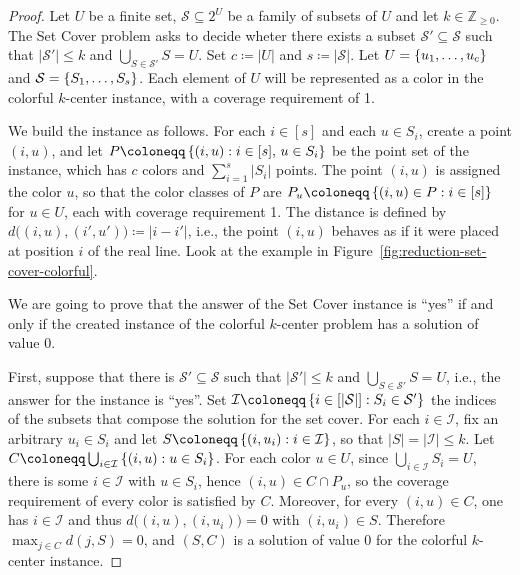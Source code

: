 \begin{proof}
    Let $U$ be a finite set, $\mathcal{S} \subseteq 2^U$ be a family of subsets of $U$ and let $k \in \mathbb{Z}_{\ge 0}$. The Set Cover problem asks to decide wheter there exists a subset $\mathcal{S}' \subseteq \mathcal{S}$ such that $|\mathcal{S}'| \le k$ and $\bigcup_{S \in \mathcal{S}'} S = U$.  Set $c \coloneqq |U|$ and $s \coloneqq |\mathcal{S}|$. Let $U = \left\{u_1,\ldots, u_c\right\}$ and $\mathcal{S} = \left\{S_1,\ldots,S_s\right\}$. Each element of $U$ will be represented as a color in the colorful $k$-center instance, with a coverage requirement of 1.

    We build the instance as follows. For each $i \in [s]$ and each $u \in S_i$, create a point $(i,u)$, and let $P \coloneqq \set{(i,u) : i \in [s],\, u \in S_i}$ be the point set of the instance, which has $c$ colors and $\sum_{i=1}^s |S_i|$ points. The point $(i,u)$ is assigned the color $u$, so that the color classes of $P$ are $P_u \coloneqq \set{(i,u) \in P : i \in [s]}$ for $u \in U$, each with coverage requirement 1. The distance is defined by $d\big((i,u),(i',u')\big) \coloneqq |i - i'|$, i.e., the point $(i,u)$ behaves as if it were placed at position $i$ of the real line. Look at the example in Figure~\ref{fig:reduction-set-cover-colorful}.
    
    We are going to prove that the answer of the Set Cover instance is ``yes'' if and only if the created instance of the colorful $k$-center problem has a solution of value 0.

    First, suppose that there is $ \mathcal{S}' \subseteq \mathcal{S}$ such that $|\mathcal{S}'| \leq k$ and $\bigcup_{S \in \mathcal{S}'} S = U$, i.e., the answer for the instance is ``yes''. Set $\mathcal{I} \coloneqq \set{i \in [|\mathcal{S}|] : S_i \in \mathcal{S}'}$ the indices of the subsets that compose the solution for the set cover. For each $i \in \mathcal{I}$, fix an arbitrary $u_i \in S_i$ and let $S \coloneqq \set{(i,u_i) : i \in \mathcal{I}}$, so that $|S| = |\mathcal{I}| \leq k$. Let $C \coloneqq \bigcup_{i \in \mathcal{I}} \set{(i,u) : u \in S_i}$. For each color $u \in U$, since $\bigcup_{i \in \mathcal{I}} S_i = U$, there is some $i \in \mathcal{I}$ with $u \in S_i$, hence $(i,u) \in C \cap P_u$, so the coverage requirement of every color is satisfied by $C$. Moreover, for every $(i,u) \in C$, one has $i \in \mathcal{I}$ and thus $d\big((i,u),(i,u_i)\big) = 0$ with $(i,u_i) \in S$. Therefore $\max_{j \in C} d(j,S) = 0$, and $(S,C)$ is a solution of value 0 for the colorful $k$-center instance.


\end{proof}
